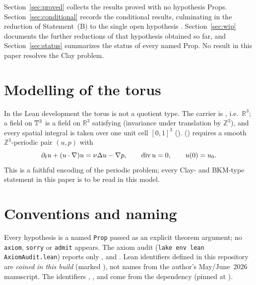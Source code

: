 \documentclass[11pt]{article}
\begin{document}
Section~\ref{sec:proved} collects the results proved with no hypothesis Props. Section~\ref{sec:conditional} records the conditional results, culminating in the reduction of Statement~(B) to the single open hypothesis . Section~\ref{sec:wip} documents the further reductions of that hypothesis obtained so far, and Section~\ref{sec:status} summarizes the status of every named Prop. No result in this paper resolves the Clay problem.

\section{Modelling of the torus}\label{sec:model}
In the Lean development the torus is not a quotient type. The carrier  is , i.e.\ $\mathbb{R}^3$; a field on $\mathbb{T}^3$ is a field on $\mathbb{R}^3$ satisfying  (invariance under translation by $\mathbb{Z}^3$), and every spatial integral is taken over one unit cell $[0,1]^3$ ().  () requires a smooth $\mathbb{Z}^3$-periodic pair $(u,p)$ with
\[\partial_t u+(u\cdot\nabla)u=\nu\Delta u-\nabla p,\qquad \operatorname{div} u=0,\qquad u(0)=u_0 .\]
This is a faithful encoding of the periodic problem; every Clay- and BKM-type statement in this paper is to be read in this model.

\section{Conventions and naming}
Every hypothesis is a named \texttt{Prop} passed as an explicit theorem argument; no \texttt{axiom}, \texttt{sorry} or \texttt{admit} appears. The axiom audit (\texttt{lake env lean AxiomAudit.lean}) reports only ,  and . Lean identifiers defined in this repository are \emph{coined in this build} (marked \coined), not names from the author's May/June~2026 manuscript. The identifiers , ,  and  come from the dependency  (pinned at ).
\end{document}
